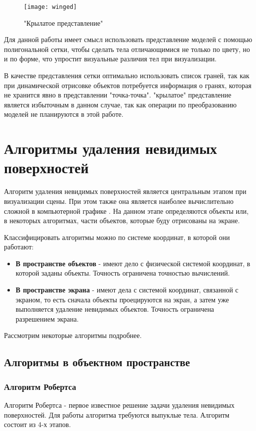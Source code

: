\begin{figure}[h]
	\centering
	\texttt{[image: winged]}
	\caption{"Крылатое представление"}
	\label{fig:winged}
\end{figure}


Для данной работы имеет смысл использовать представление моделей с помощью полигональной сетки, чтобы сделать тела отличающимися не только по цвету, но и по форме, что упростит визуальные различия тел при визуализации.

В качестве представления сетки оптимально использовать список граней, так как при динамической отрисовке объектов потребуется информация о гранях, которая не хранится явно в представлении "точка-точка". "крылатое"  представление является избыточным в данном случае, так как операции по преобразованию моделей не планируются в этой работе.

\section{Алгоритмы удаления невидимых поверхностей}

Алгоритм удаления невидимых поверхностей является
центральным этапом при визуализации сцены. При этом также она является наиболее вычислительно сложной в компьютерной графике \cite{rodgers}. На данном этапе определяются объекты или, в некоторых алгоритмах, части объектов, которые буду отрисованы на экране.

Классифицировать алгоритмы можно по системе координат, в которой они работают:
\begin{itemize}
	\item\textbf{В пространстве объектов} - имеют дело с физической системой координат, в которой заданы объекты. Точность ограничена точностью вычислений.
	\item\textbf{В пространстве экрана} - имеют дела с системой координат, связанной с экраном, то есть сначала объекты проецируются на экран, а затем уже выполняется удаление невидимых объектов. Точность ограничена разрешением экрана.
\end{itemize}
Рассмотрим некоторые алгоритмы подробнее.

\subsection{Алгоритмы в объектном пространстве}
\subsubsection{Алгоритм Робертса}
Алгоритм Робертса - первое известное решение задачи удаления невидимых поверхностей. Для работы алгоритма требуются выпуклые тела. Алгоритм состоит из 4-х этапов.

